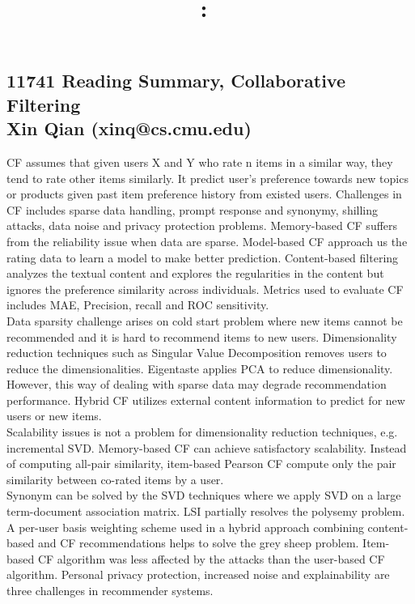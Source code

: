 \documentclass[10pt]{article}
\title{
\textmd{\textbf{\hmwkClass:\ \hmwkTitle}
}}
\author{\textbf{\hmwkAuthorName}}
\begin{document}
\subsection{11741 Reading Summary,  Collaborative Filtering\\Xin Qian (xinq@cs.cmu.edu)}
CF assumes that given users X and Y who rate n items in a similar way, they tend to rate other items similarly. It predict user's preference towards new topics or products given past item preference history from existed users. Challenges in CF includes sparse data handling, prompt response and synonymy, shilling attacks, data noise and privacy protection problems. Memory-based CF suffers from the reliability issue when data are sparse. Model-based CF approach us the rating data to learn a model to make better prediction. Content-based filtering analyzes the textual content and explores the regularities in the content but ignores the preference similarity across individuals. Metrics used to evaluate CF includes MAE, Precision, recall and ROC sensitivity. \\

Data sparsity challenge arises on cold start problem where new items cannot be recommended and it is hard to recommend items to new users. Dimensionality reduction techniques such as Singular Value Decomposition removes users to reduce the dimensionalities. Eigentaste applies PCA to reduce dimensionality. However, this way of dealing with sparse data may degrade recommendation performance. Hybrid CF utilizes external content information to predict for new users or new items. \\

Scalability issues is not a problem for dimensionality reduction techniques, e.g. incremental SVD. Memory-based CF can achieve satisfactory scalability. Instead of computing all-pair similarity, item-based Pearson CF compute only the pair similarity between co-rated items by a user. \\

Synonym can be solved by the SVD techniques where we apply SVD on a large term-document association matrix. LSI partially resolves the polysemy problem. A per-user basis weighting scheme used in a hybrid approach combining content-based and CF recommendations helps to solve the grey sheep problem. Item-based CF algorithm was less affected by the attacks than the user-based CF algorithm. Personal privacy protection, increased noise and explainability are three challenges in recommender systems. \\
\end{document}
